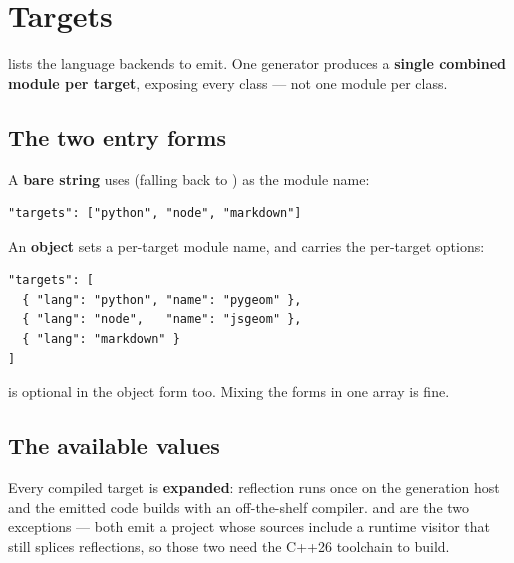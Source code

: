 \chapter{Targets}
\label{ch:targets}

 lists the language backends to emit. One generator produces a
\textbf{single combined module per target}, exposing every class --- not one
module per class.

\section{The two entry forms}

A \textbf{bare string} uses  (falling back to
) as the module name:

\begin{lstlisting}[style=json]
"targets": ["python", "node", "markdown"]
\end{lstlisting}

An \textbf{object} sets a per-target module name, and carries the per-target
options:

\begin{lstlisting}[style=json]
"targets": [
  { "lang": "python", "name": "pygeom" },
  { "lang": "node",   "name": "jsgeom" },
  { "lang": "markdown" }
]
\end{lstlisting}

 is optional in the object form too. Mixing the forms in one array
is fine.

\section{The available  values}

Every compiled target is \textbf{expanded}: reflection runs once on the
generation host and the emitted code builds with an off-the-shelf compiler.
 and  are the two exceptions --- both emit a project whose
sources include a runtime visitor that still splices reflections, so those two
need the C++26 toolchain to build.

